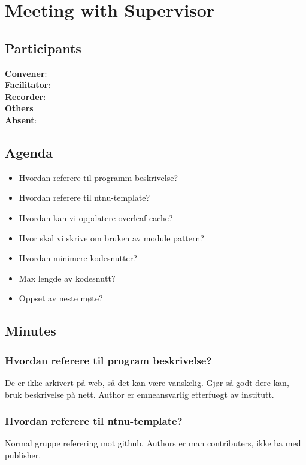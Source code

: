 \section*{Meeting with Supervisor}

\subsection*{Participants}

\textbf{Convener}: \supervisor{}        \\
\textbf{Facilitator}: \facilitator{}    \\
\textbf{Recorder}: \scrummaster{}       \\
\textbf{Others}  \groupleader{}         \\
\textbf{Absent}: 

\subsection*{Agenda}
\begin{itemize}
    \item Hvordan referere til programm beskrivelse?
    \item Hvordan referere til ntnu-template?
    \item Hvordan kan vi oppdatere overleaf cache? 
    \item Hvor skal vi skrive om bruken av module pattern?
    \item Hvordan minimere kodesnutter?
    \item Max lengde av kodesnutt?
    \item Oppset av neste møte?
\end{itemize}

\subsection*{Minutes}
\subsubsection{Hvordan referere til program beskrivelse?}
De er ikke arkivert på web, så det kan være vanskelig. Gjør så godt dere kan, bruk beskrivelse på nett. Author er emneansvarlig etterfuøgt av institutt. 

\subsubsection{Hvordan referere til ntnu-template?}
Normal gruppe referering mot github. Authors er man contributers, ikke ha med publisher.

